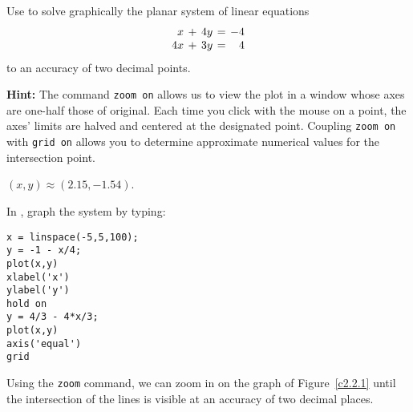 \documentclass{ximera}
\begin{document}
\begin{exercise} \label{c2.2.1}
Use \Matlab to solve graphically the planar system of linear
equations
\[
\arraycolsep 2pt
\begin{array}{rcrcr}
 x & + & 4y & = & -4 \\
4x & + & 3y & = &  4
\end{array}
\]
to an accuracy of two decimal points.

{\bf Hint:} The \Matlab command {\tt zoom on}
allows us to
view the plot in a window whose axes are one-half those of
original.  Each time you click with the mouse on a point,
the axes' limits are halved and centered at the designated
point. Coupling {\tt zoom on} with {\tt grid on} allows you
to determine approximate numerical values for the intersection
point.

\begin{solution}

\ans $(x,y) \approx (2.15,-1.54)$.

\soln In \Matlab, graph the system by typing:
\begin{verbatim}
x = linspace(-5,5,100);
y = -1 - x/4;
plot(x,y)
xlabel('x')
ylabel('y')
hold on
y = 4/3 - 4*x/3;
plot(x,y)
axis('equal')
grid
\end{verbatim}

Using the {\tt zoom} command, we can zoom in on the graph of
Figure~\ref{c2.2.1} until the intersection of the lines is
visible at an accuracy of two decimal places.  

\begin{figure}[htb]
                       \centerline{%
                       }
\end{figure}

\end{solution}
\end{exercise}
\end{document}
